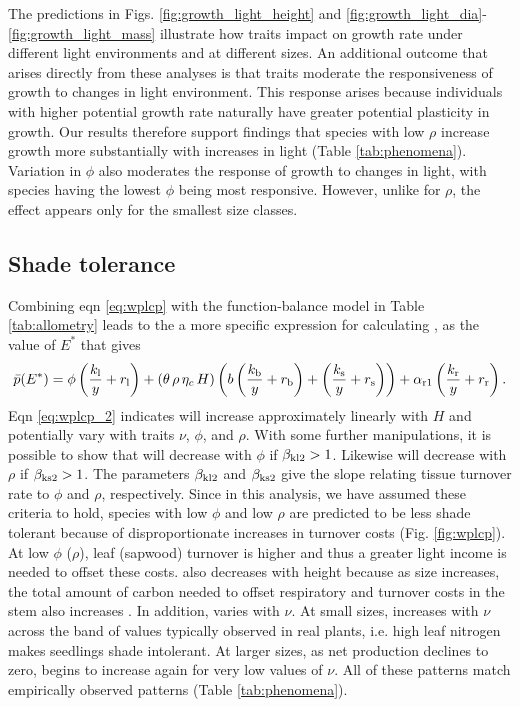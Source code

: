 \documentclass[a4paper,11pt]{article}
\begin{document}
The predictions in Figs. \ref{fig:growth_light_height} and \ref{fig:growth_light_dia}-\ref{fig:growth_light_mass} illustrate how traits impact on growth rate under different light environments and at different sizes. An additional outcome that arises directly from these analyses is that traits moderate the responsiveness of growth to changes in light environment. This response arises because individuals with higher potential growth rate naturally have greater potential plasticity in growth. Our results therefore support findings that species with low $\rho$ increase growth more substantially with increases in light (Table \ref{tab:phenomena}). Variation in $\phi$ also moderates the response of growth to changes in light, with species having the lowest $\phi$ being most responsive. However, unlike for $\rho$, the effect appears only for the smallest size classes.

\subsection{Shade tolerance}
Combining eqn \ref{eq:wplcp} with the function-balance model in Table \ref{tab:allometry} leads to the a more specific expression for calculating {\wplcp}, as the value of $E^*$ that gives
\begin{equation}\label{eq:wplcp_2}
\bar{p}(E^*) =
      \phi \left(\frac{k_{\rm l}}{y} + r_{\rm l}\right) +
      \left(\theta \, \rho \, \eta_c \, H\right)
        \left(b\left(\frac{k_{\rm b}}{y} + r_{\rm b}\right)
            + \left(\frac{k_{\rm s}}{y} + r_{\rm s}\right)\right) +
      \alpha_{\rm r1} \left(\frac{k_{\rm r}}{y} + r_{\rm r}\right).
\end{equation}
Eqn \ref{eq:wplcp_2} indicates {\wplcp} will increase approximately linearly with $H$ and potentially vary with traits $\nu$, $\phi$, and $\rho$. With some further manipulations, it is possible to show that {\wplcp} will decrease with $\phi$ if $\beta_{{\rm kl2}} >1$. Likewise {\wplcp} will decrease with $\rho$ if $\beta_{{\rm ks2}} >1$. The parameters $\beta_{{\rm kl2}}$ and $\beta_{{\rm ks2}}$ give the slope relating tissue turnover rate to $\phi$ and $\rho$, respectively. Since in this analysis, we have assumed these criteria to hold, species with low $\phi$ and low $\rho$ are predicted to be less shade tolerant because of disproportionate increases in turnover costs (Fig. \ref{fig:wplcp}). At low $\phi$ ($\rho$), leaf (sapwood) turnover is higher and thus a greater light income is needed to offset these costs. {\wplcp} also decreases with height because as size increases, the total amount of carbon needed to offset respiratory and turnover costs in the stem also increases \citep{Givnish-1988}. In addition, {\wplcp} varies with $\nu$. At small sizes, {\wplcp} increases with $\nu$ across the band of values typically observed in real plants, i.e. high leaf nitrogen makes seedlings shade intolerant. At larger sizes, as net production declines to zero, {\wplcp} begins to increase again for very low values of $\nu$. All of these patterns match empirically observed patterns (Table \ref{tab:phenomena}).
\end{document}
